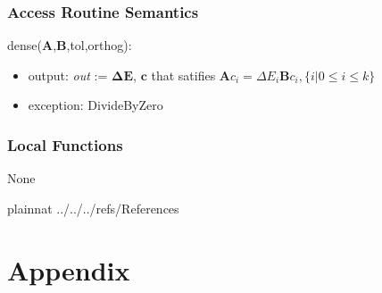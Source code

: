 \documentclass[12pt, titlepage]{article}
\begin{document}

\subsubsection{Access Routine Semantics}

\noindent dense($\textbf{A}$,$\textbf{B}$,tol,orthog):
\begin{itemize}
	\item output: \textit{out} := $\boldsymbol{\Delta E}$, $\boldsymbol{c}$ 
	that satifies $\boldsymbol{A}c_i=\Delta E_i \boldsymbol{B} c_i, \{i|0\le i 
	\le k\} $
	\item exception: DivideByZero 
\end{itemize}

%

\subsubsection{Local Functions}

None

\newpage

 {plainnat}
 {../../../refs/References}

\newpage

\section{Appendix} \label{Appendix}

\end{document}
